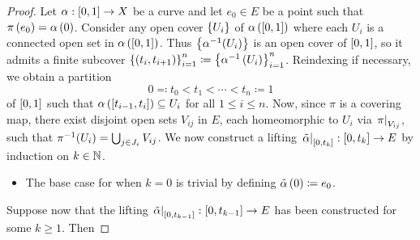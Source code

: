 \documentclass[../Moduli_Spaces_of_Riemann_Surfaces.tex]{subfiles}
\begin{document}
    \begin{proof}
        Let $\alpha:\left[0,1\right]\to X$ be a curve and let $e_0\in E$ be a point such that $\pi\left(e_0\right)=\alpha\left(0\right)$. Consider any open cover $\left\{U_i\right\}$ of $\alpha\left(\left[0,1\right]\right)$ where each $U_i$ is a connected open set in $\alpha\left(\left[0,1\right]\right)$. Thus $\left\{\alpha^{-1}\!\left(U_i\right)\right\}$ is an open cover of $\left[0,1\right]$, so it admits a finite subcover $\left\{\left(t_i,t_{i+1}\right)\right\}_{i=1}^n\coloneqq\left\{\alpha^{-1}\left(U_i\right)\right\}_{i=1}^n$. Reindexing if necessary, we obtain a partition
        \begin{equation*}
            0\eqqcolon t_0<t_1<\cdots<t_n\coloneqq1
        \end{equation*}
        of $\left[0,1\right]$ such that $\alpha\left(\left[t_{i-1},t_i\right]\right)\subseteq U_i$ for all $1\leq i\leq n$. Now, since $\pi$ is a covering map, there exist disjoint open sets $V_{ij}$ in $E$, each homeomorphic to $U_i$ via $\left.\pi\right|_{V_{ij}}$, such that $\pi^{-1}\!\left(U_i\right)=\bigcup_{j\in J_i}V_{ij}$. We now construct a lifting $\left.\tilde{\alpha}\right|_{\left[0,t_k\right]}:\left[0,t_k\right]\to E$ by induction on $k\in\mathbb{N}$.
        \begin{itemize}
            \item The base case for when $k=0$ is trivial by defining $\tilde{\alpha}\left(0\right)\coloneqq e_0$.
        \end{itemize}
        Suppose now that the lifting $\left.\tilde{\alpha}\right|_{\left[0,t_{k-1}\right]}:\left[0,t_{k-1}\right]\to E$ has been constructed for some $k\geq1$. Then
\end{proof}
\end{document}
